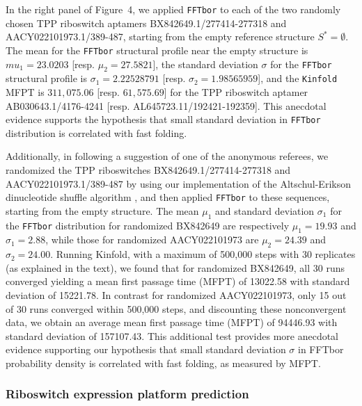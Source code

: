In the right panel of Figure~4, we
applied {\tt FFTbor} to each of the two randomly chosen TPP riboswitch
aptamers BX842649.1/277414-277318 and AACY022101973.1/389-487, starting
from the empty reference structure $S^*=\emptyset$.
The mean for the {\tt FFTbor} structural profile near the empty
structure is $mu_1=23.0203$  [resp. $\mu_2=27.5821$], the
standard deviation $\sigma$ for the {\tt FFTbor} structural profile
is $\sigma_1=2.22528791$  [resp. $\sigma_2=1.98565959$], and the {\tt Kinfold} MFPT is
$311,075.06$ [resp. $61,575.69$] for the TPP riboswitch aptamer
AB030643.1/4176-4241 [resp.  AL645723.11/192421-192359]. This anecdotal evidence supports the hypothesis that small standard deviation in {\tt FFTbor} distribution is correlated with fast folding.

Additionally, in following a suggestion of one of the anonymous referees, we randomized the TPP riboswitches BX842649.1/277414-277318 and AACY022101973.1/389-487 by using our implementation of the Altschul-Erikson dinucleotide shuffle algorithm
\cite{altschulErikson:dinucleotideShuffle}, and then applied {\tt FFTbor} to these sequences, starting from the empty structure.  The mean $\mu_1$ and standard deviation $\sigma_1$ for the {\tt FFTbor} distribution for randomized BX842649 are respectively $\mu_1=19.93$ and $\sigma_1=2.88$, while those for randomized AACY022101973 are $\mu_2= 24.39$ and $\sigma_2=24.00$. Running Kinfold, with a maximum of 500,000 steps with 30 replicates (as explained in the text), we found that for randomized BX842649, all 30 runs converged yielding a mean first passage time (MFPT) of 13022.58  with standard deviation of 15221.78. In contrast for randomized AACY022101973, only 15 out of 30 runs converged within 500,000 steps, and discounting these nonconvergent data, we obtain an average mean first passage time (MFPT) of 94446.93  with standard deviation of 157107.43. This additional test provides more anecdotal evidence supporting our hypothesis that small standard deviation $\sigma$ in FFTbor probability density is correlated with fast folding, as measured by MFPT.
%
%

\subsubsection*{Riboswitch expression platform prediction}

